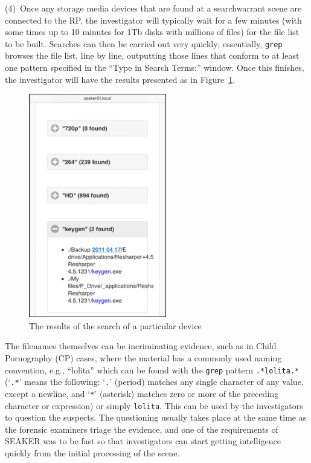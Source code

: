 \documentclass[12pt]{article}
\begin{document}
(4)~Once any storage media devices that are found at a \gls{searchwarrant} scene
are connected to the RP, the investigator will typically wait for a
few minutes (with some times up to 10 minutes for 1Tb disks with
millions of files) for the file list to be built. Searches can then
be carried out very quickly; essentially, \verb|grep| browses the file
list, line by line, outputting those lines that conform to at least
one pattern specified in the ``Type in Search Terms:'' window. Once
this finishes, the investigator will have the results presented as in
Figure~\ref{fig:screen-3}.

\begin{figure}[H]
  \begin{center}
  \includegraphics[width=6cm]{images/seaker-hh-screen-3.jpg}
  \caption{The results of the search of a particular device}
  \label{fig:screen-3}
  \end{center}
\end{figure}

The filenames themselves can be incriminating evidence, such as in
Child Pornography (CP) cases, where the material has a commonly used
naming convention, e.g., ``lolita'' which can be found with the \verb|grep|
pattern \verb|.*lolita.*| (`\verb|.*|' means the
following: `\verb|.|' (period)  matches any single character of any
value, except
a newline, and `\verb|*|' (asterisk) matches zero or more of the
preceding character or expression) or simply \verb|lolita|.
This can be used by the
investigators to question the suspects.  The questioning usually
takes place at the same time as the forensic examiners triage the
evidence, and one of the requirements of SEAKER was to be fast so that
investigators can start getting intelligence quickly from the initial
processing of the scene.\\
\end{document}
